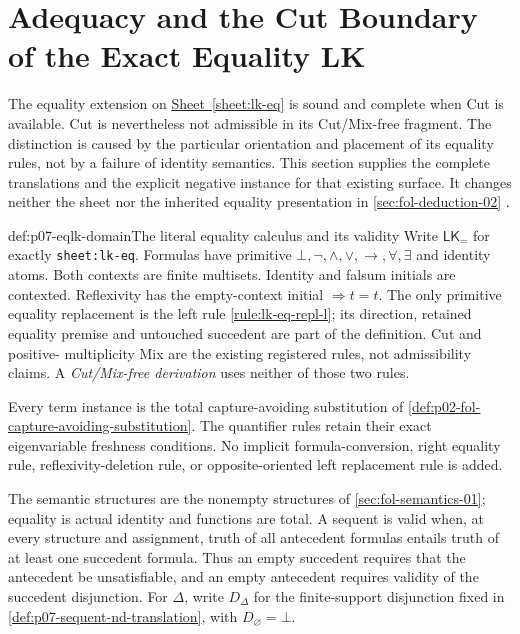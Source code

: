 \section{Adequacy and the Cut Boundary of the Exact Equality LK}
\label{sec:p07-equality-lk-metatheory}

The equality extension on \hyperref[sheet:lk-eq]{Sheet~\ref*{sheet:lk-eq}}
is sound and complete when Cut is available. Cut is nevertheless not
admissible in its Cut/Mix-free fragment. The distinction is caused by the
particular orientation and placement of its equality rules, not by a failure
of identity semantics. This section supplies the complete translations and
the explicit negative instance for that existing surface. It changes neither
the sheet nor the inherited equality presentation in
\cref{sec:fol-deduction-02} \cite{Enderton2001,Mendelson1997}.

\begin{hbdefinition}{def:p07-eqlk-domain}{The literal equality calculus and its validity}
Write \(\mathsf{LK}_{=}\) for exactly \texttt{sheet:lk-eq}.
Formulas have primitive \(\bot,\neg,\land,\lor,\to,\forall,\exists\)
and identity atoms. Both contexts are finite multisets. Identity and
falsum initials are contexted. Reflexivity has the empty-context initial
\(\Rightarrow t=t\). The only primitive equality replacement is the
left rule \ref{rule:lk-eq-repl-l}; its direction, retained equality premise
and untouched succedent are part of the definition. Cut and positive-
multiplicity Mix are the existing registered rules, not admissibility claims.
A \emph{Cut/Mix-free derivation} uses neither of those two rules.

Every term instance is the total capture-avoiding substitution of
\cref{def:p02-fol-capture-avoiding-substitution}. The quantifier rules
retain their exact eigenvariable freshness conditions. No implicit
formula-conversion, right equality rule, reflexivity-deletion rule, or
opposite-oriented left replacement rule is added.

The semantic structures are the nonempty structures of
\cref{sec:fol-semantics-01}; equality is actual identity and functions
are total. A sequent is valid when, at every structure and assignment,
truth of all antecedent formulas entails truth of at least one succedent
formula. Thus an empty succedent requires that the antecedent be
unsatisfiable, and an empty antecedent requires validity of the succedent
disjunction. For \(\Delta\), write \(D_\Delta\) for the finite-support
disjunction fixed in \cref{def:p07-sequent-nd-translation}, with
\(D_\varnothing=\bot\).
\end{hbdefinition}

